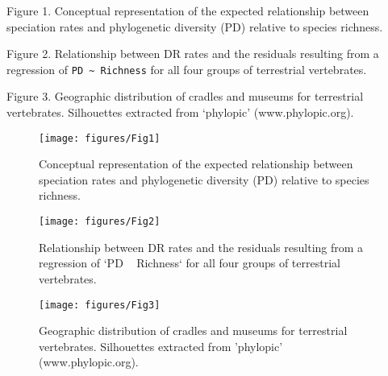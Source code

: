 \documentclass[
  11pt,
]{article}
\begin{document}
Figure 1. Conceptual representation of the expected relationship between
speciation rates and phylogenetic diversity (PD) relative to species
richness.

Figure 2. Relationship between DR rates and the residuals resulting from
a regression of \texttt{PD\ \textasciitilde{}\ Richness} for all four
groups of terrestrial vertebrates.

Figure 3. Geographic distribution of cradles and museums for terrestrial
vertebrates. Silhouettes extracted from `phylopic' (www.phylopic.org).

\newpage

\begin{figure}

{\centering \texttt{[image: figures/Fig1]} 

}

\caption{Conceptual representation of the expected relationship between speciation rates and phylogenetic diversity (PD) relative to species richness.}\label{fig:unnamed-chunk-1}
\end{figure}

\newpage

\begin{figure}

{\centering \texttt{[image: figures/Fig2]} 

}

\caption{Relationship between DR rates and the residuals resulting from a regression of `PD ~ Richness` for all four groups of terrestrial vertebrates. }\label{fig:unnamed-chunk-2}
\end{figure}

\newpage

\begin{figure}

{\centering \texttt{[image: figures/Fig3]} 

}

\caption{Geographic distribution of cradles and museums for terrestrial vertebrates. Silhouettes extracted from 'phylopic' (www.phylopic.org).}\label{fig:unnamed-chunk-3}
\end{figure}

\newpage
\end{document}
